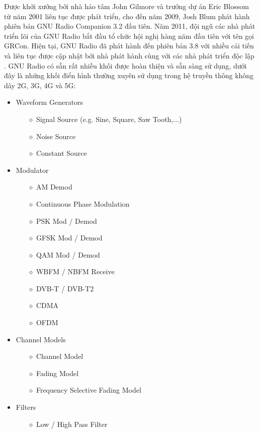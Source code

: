 Được khởi xướng bởi nhà hảo tâm John Gilmore và trưởng dự án Eric Blossom từ năm 2001 liên tục được phát triển, cho đến năm 2009, Josh Blum phát hành phiên bản GNU Radio Companion 3.2 đầu tiên. Năm 2011, đội ngũ các nhà phát triển lõi của GNU Radio bắt đầu tổ chức hội nghị hàng năm đầu tiên với tên gọi GRCon. Hiện tại, GNU Radio đã phát hành đến phiên bản 3.8 với nhiều cải tiến và liên tục được cập nhật bởi nhà phát hành cùng với các nhà phát triển độc lập \cite{PyBombs}. GNU Radio có sẵn rất nhiều khối được hoàn thiện và sẵn sàng sử dụng, dưới đây là những khối điển hình thường xuyên sử dụng trong hệ truyền thông không dây 2G, 3G, 4G và 5G:
\renewcommand{\labelitemi}{$-$}
\begin{itemize}
\item Waveform Generators 
	\begin{itemize}
		\item[$\diamond$] Signal Source (e.g. Sine, Square, Saw Tooth,...)
		\item[$\diamond$] Noise Source
		\item[$\diamond$] Constant Source
	\end{itemize}
\item Modulator
	\begin{itemize}
		\item[$\diamond$] AM Demod
		\item[$\diamond$] Continuous Phase Modulation
		\item[$\diamond$] PSK Mod / Demod
		\item[$\diamond$] GFSK Mod / Demod
		\item[$\diamond$] QAM Mod / Demod
		\item[$\diamond$] WBFM / NBFM Receive
		\item[$\diamond$] DVB-T / DVB-T2
		\item[$\diamond$] CDMA \cite{Kavitha2015}
		\item[$\diamond$] OFDM \cite{Bloessl2013}
	\end{itemize}
\item  Channel Models 
	\begin{itemize}
		\item[$\diamond$] Channel Model
		\item[$\diamond$] Fading Model
		\item[$\diamond$] Frequency Selective Fading Model
	\end{itemize}
\item Filters
	\begin{itemize}
		\item[$\diamond$] Low / High Pass Filter

\end{itemize}
\end{itemize}
